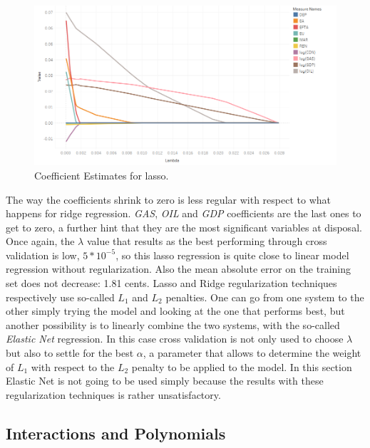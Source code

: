 \documentclass[a4paper,12pt]{book}
\begin{document}
\begin{figure}[tb]
\begin{center}
\captionsetup{justification=centering}
\includegraphics[width=1\textwidth]{Images/lasso.png}
\caption{Coefficient Estimates for lasso.}
\label{fig:lasso}
\end{center}
\end{figure}

The way the coefficients shrink to zero is less regular with respect to what happens for ridge regression. \textit{GAS}, \textit{OIL} and \textit{GDP} coefficients are the last ones to get to zero, a further hint that they are the most significant variables at disposal. Once again, the $\lambda$ value that results as the best performing through cross validation is low, $5*10^{-5}$, so this lasso regression is quite close to linear model regression without regularization. Also the mean absolute error on the training set does not decrease: 1.81 cents. Lasso and Ridge regularization techniques respectively use so-called $L_1$ and $L_2$ penalties. One can go from one system to the other simply trying the model and looking at the one that performs best, but another possibility is to linearly combine the two systems, with the so-called \textit{Elastic Net} regression. In this case cross validation is not only used to choose $\lambda$ but also to settle for the best $\alpha$, a parameter that allows to determine the weight of $L_1$ with respect to the $L_2$ penalty to be applied to the model. In this section Elastic Net is not going to be used simply because the results with these regularization techniques is rather unsatisfactory.

\subsection{Interactions and Polynomials}
\end{document}
